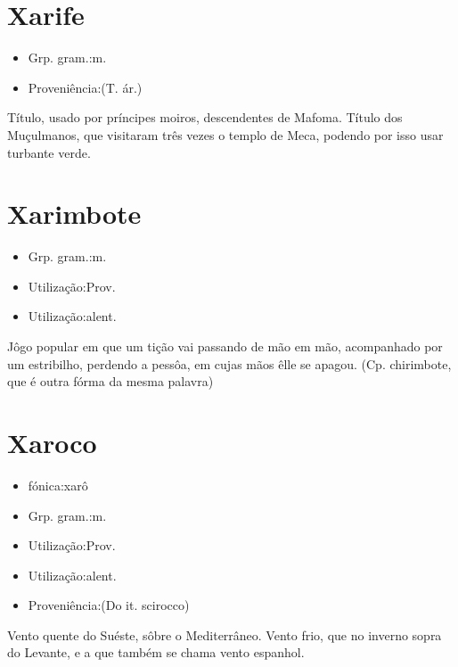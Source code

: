 \section{Xarife}
\begin{itemize}
\item {Grp. gram.:m.}
\end{itemize}
\begin{itemize}
\item {Proveniência:(T. ár.)}
\end{itemize}
Título, usado por príncipes moiros, descendentes de Mafoma.
Título dos Muçulmanos, que visitaram três vezes o templo de Meca, podendo por isso usar turbante verde.
\section{Xarimbote}
\begin{itemize}
\item {Grp. gram.:m.}
\end{itemize}
\begin{itemize}
\item {Utilização:Prov.}
\end{itemize}
\begin{itemize}
\item {Utilização:alent.}
\end{itemize}
Jôgo popular em que um tição vai passando de mão em mão, acompanhado por um estribilho, perdendo a pessôa, em cujas mãos êlle se apagou.
(Cp. \textunderscore chirimbote\textunderscore , que é outra fórma da mesma palavra)
\section{Xaroco}
\begin{itemize}
\item {fónica:xarô}
\end{itemize}
\begin{itemize}
\item {Grp. gram.:m.}
\end{itemize}
\begin{itemize}
\item {Utilização:Prov.}
\end{itemize}
\begin{itemize}
\item {Utilização:alent.}
\end{itemize}
\begin{itemize}
\item {Proveniência:(Do it. \textunderscore scirocco\textunderscore )}
\end{itemize}
Vento quente do Suéste, sôbre o Mediterrâneo.
Vento frio, que no inverno sopra do Levante, e a que também se chama vento espanhol.
